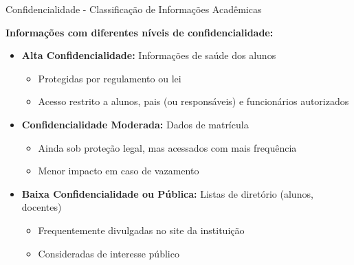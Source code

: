 \begin{frame}{Confidencialidade - Classificação de Informações Acadêmicas}


\begin{block}{\textbf{Informações com diferentes níveis de confidencialidade:}}
\begin{itemize}
  \item \textbf{Alta Confidencialidade:} Informações de saúde dos alunos
  \begin{itemize}
    \item Protegidas por regulamento ou lei
    \item Acesso restrito a alunos, pais (ou responsáveis) e funcionários autorizados
  \end{itemize}
  
  \item \textbf{Confidencialidade Moderada:} Dados de matrícula
  \begin{itemize}
    \item Ainda sob proteção legal, mas acessados com mais frequência
    \item Menor impacto em caso de vazamento
  \end{itemize}
  
  \item \textbf{Baixa Confidencialidade ou Pública:} Listas de diretório (alunos, docentes)
  \begin{itemize}
    \item Frequentemente divulgadas no site da instituição
    \item Consideradas de interesse público
  \end{itemize}
\end{itemize}
\end{block}

\end{frame}

